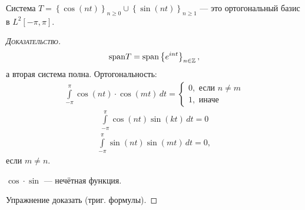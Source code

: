 \documentclass[../complex-analysis.tex]{subfiles}
\begin{document}
\begin{crly}
 Система $ T = \left\{\cos(nt)\right\}_{n \geqslant 0} \cup \left\{\sin(nt)\right\}_{n \geqslant 1}  $ --- это ортогональный базис в $ L^{2}[-\pi,\pi] $.
\end{crly}
\begin{proof}[\normalfont\textsc{Доказательство}]
 \begin{align*}
  \mathrm{span}T = \mathrm{span} \left\{ e^{int} \right\}_{n \in \mathbb{Z}},
 \end{align*} а вторая система полна. Ортогональность:
 \begin{align*}
  \int\limits_{-\pi}^{\pi} \cos(nt) \cdot \cos(mt) \,dt = \begin{cases}
   0, \text{ если } n \neq m \\
   1, \text{ иначе }
  \end{cases} 
 \end{align*}
 \begin{align*}
  \int\limits_{-\pi}^{\pi} \cos(nt)\sin(kt)\,dt = 0
 \end{align*}
 \begin{align*}
  \int\limits_{-\pi}^{\pi} \sin(nt)\sin(mt)\,dt = 0,
 \end{align*} если $ m \neq n $.

 $ \cos \cdot \sin $ --- нечётная функция.

 Упражнение доказать (триг. формулы).
\end{proof}
\end{document}
